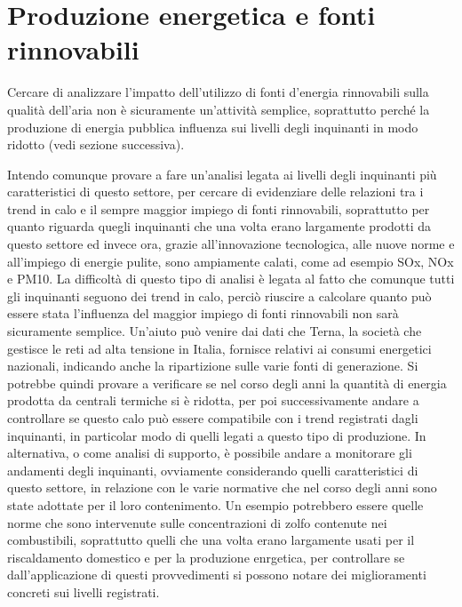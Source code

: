 \documentclass{article}
\begin{document}
\section{Produzione energetica e fonti rinnovabili}
Cercare di analizzare l'impatto dell'utilizzo di fonti d'energia rinnovabili sulla qualità dell'aria non è sicuramente un'attività semplice, soprattutto perché la produzione di energia pubblica influenza sui livelli degli inquinanti in modo ridotto (vedi sezione successiva).

Intendo comunque provare a fare un'analisi legata ai livelli degli inquinanti più caratteristici di questo settore, per cercare di evidenziare delle relazioni tra i trend in calo e il sempre maggior impiego di fonti rinnovabili, soprattutto per quanto riguarda quegli inquinanti che una volta erano largamente prodotti da questo settore ed invece ora, grazie all'innovazione tecnologica, alle nuove norme e all'impiego di energie pulite, sono ampiamente calati, come ad esempio SOx, NOx e PM10.
La difficoltà di questo tipo di analisi è legata al fatto che comunque tutti gli inquinanti seguono dei trend in calo, perciò riuscire a calcolare quanto può essere stata l'influenza del maggior impiego di fonti rinnovabili non sarà sicuramente semplice. Un'aiuto può venire dai dati che Terna, la società che gestisce le reti ad alta tensione in Italia, fornisce relativi ai consumi energetici nazionali, indicando anche la ripartizione sulle varie fonti di generazione. Si potrebbe quindi provare a verificare se nel corso degli anni la quantità di energia prodotta da centrali termiche si è ridotta, per poi successivamente andare a controllare se questo calo può essere compatibile con i trend registrati dagli inquinanti, in particolar modo di quelli legati a questo tipo di produzione. In alternativa, o come analisi di supporto, è possibile andare a monitorare gli andamenti degli inquinanti, ovviamente considerando quelli caratteristici di questo settore, in relazione con le varie normative che nel corso degli anni sono state adottate per il loro contenimento. Un esempio potrebbero essere quelle norme che sono intervenute sulle concentrazioni di zolfo contenute nei combustibili, soprattutto quelli che una volta erano largamente usati per il riscaldamento domestico e per la produzione enrgetica, per controllare se dall'applicazione di questi provvedimenti si possono notare dei miglioramenti concreti sui livelli registrati. 
\end{document}

